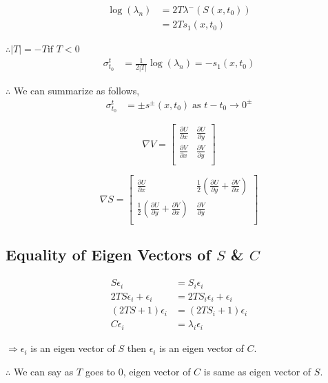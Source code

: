 \documentclass[../report.tex]{subfiles}
\begin{document}
\begin{equation}
  \begin{aligned}
    \log(\lambda_n) &= 2T\lambda^- (S(x, t_0)) \\
    &= 2Ts_1(x, t_0)
  \end{aligned}
\end{equation}

\(\therefore |T| = -T \text{if } T < 0\)
\begin{equation}
  \begin{aligned}
    \sigma_{t_0}^t &= \frac{1}{2|T|} \log(\lambda_n) = -s_1(x, t_0)
  \end{aligned}
\end{equation}

\(\therefore\) We can summarize as follows,
\begin{equation}
  \begin{aligned}
    \sigma_{t_0}^t &= \pm s^\pm (x, t_0)\; \text{as } t - t_0 \rightarrow 0^\pm
  \end{aligned}
\end{equation}

\begin{equation}
  \nabla V = \begin{bmatrix}
    \frac{\partial U}{\partial x} & \frac{\partial U}{\partial y} \\[12pt]
    \frac{\partial V}{\partial x} & \frac{\partial V}{\partial y} \\
  \end{bmatrix}
\end{equation}

\begin{equation}
  \nabla S = \begin{bmatrix}
    \frac{\partial U}{\partial x} & \frac{1}{2} (\frac{\partial U}{\partial y} + \frac{\partial V}{\partial x}) \\[12pt]
    \frac{1}{2} (\frac{\partial U}{\partial y} + \frac{\partial V}{\partial x}) & \frac{\partial V}{\partial y} \\
  \end{bmatrix}
\end{equation}

\subsection{Equality of Eigen Vectors of \(S\) \& \(C\)}
\begin{equation}
  \begin{aligned}
    S\epsilon_i &= S_i\epsilon_i \\
    2TS\epsilon_i + \epsilon_i &= 2TS_i\epsilon_i + \epsilon_i \\
    (2TS + 1)\epsilon_i &= (2TS_i + 1)\epsilon_i \\
    C\epsilon_i &= \lambda_i\epsilon_i
  \end{aligned}
\end{equation}

\(\Rightarrow \epsilon_i\) is an eigen vector of \(S\) then \(\epsilon_i\) is an eigen vector of \(C\).

\(\therefore\) We can say as \(T\) goes to 0, eigen vector of \(C\) is same as eigen vector of \(S\).
\end{document}
